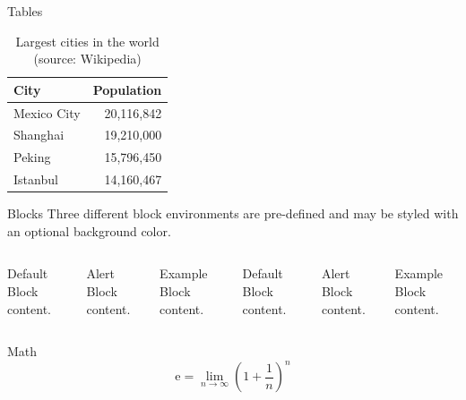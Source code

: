﻿\documentclass[10pt]{beamer}
\begin{document}
\begin{frame}{Tables}
  \begin{table}
    \caption{Largest cities in the world (source: Wikipedia)}
    \begin{tabular}{@{} lr @{}}
      \toprule
      City & Population\\
      \midrule
      Mexico City & 20,116,842\\
      Shanghai & 19,210,000\\
      Peking & 15,796,450\\
      Istanbul & 14,160,467\\
      \bottomrule
    \end{tabular}
  \end{table}
\end{frame}
\begin{frame}{Blocks}
  Three different block environments are pre-defined and may be styled with an
  optional background color.

  \begin{columns}[T,onlytextwidth]
      \begin{block}{Default}
        Block content.
      \end{block}

      \begin{alertblock}{Alert}
        Block content.
      \end{alertblock}

      \begin{exampleblock}{Example}
        Block content.
      \end{exampleblock}



      \begin{block}{Default}
        Block content.
      \end{block}

      \begin{alertblock}{Alert}
        Block content.
      \end{alertblock}

      \begin{exampleblock}{Example}
        Block content.
      \end{exampleblock}

  \end{columns}
\end{frame}
\begin{frame}{Math}
  \begin{equation*}
    \mathrm{e} = \lim_{n\to \infty} \left(1 + \frac{1}{n}\right)^n
  \end{equation*}
\end{frame}
\end{document}
